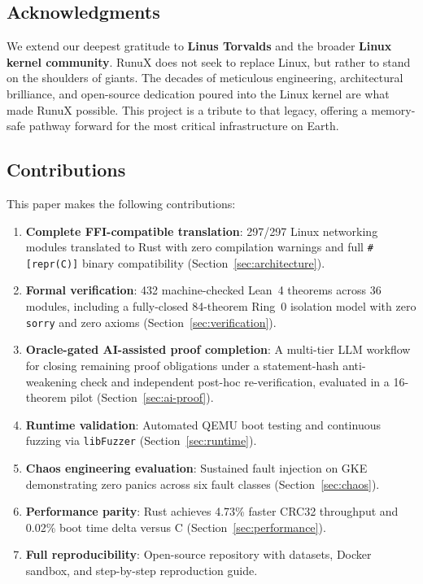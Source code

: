 \documentclass[sigconf,nonacm=false]{acmart}
\begin{document}
\subsection{Acknowledgments}
We extend our deepest gratitude to \textbf{Linus Torvalds} and the broader \textbf{Linux kernel community}. RunuX does not seek to replace Linux, but rather to stand on the shoulders of giants. The decades of meticulous engineering, architectural brilliance, and open-source dedication poured into the Linux kernel are what made RunuX possible. This project is a tribute to that legacy, offering a memory-safe pathway forward for the most critical infrastructure on Earth.

\subsection{Contributions}
This paper makes the following contributions:
\begin{enumerate}
    \item \textbf{Complete FFI-compatible translation}: 297/297 Linux networking modules translated to Rust with zero compilation warnings and full \texttt{\#[repr(C)]} binary compatibility (Section~\ref{sec:architecture}).
    \item \textbf{Formal verification}: 432 machine-checked Lean~4 theorems across 36 modules, including a fully-closed 84-theorem Ring~0 isolation model with zero \texttt{sorry} and zero axioms (Section~\ref{sec:verification}).
    \item \textbf{Oracle-gated AI-assisted proof completion}: A multi-tier LLM workflow for closing remaining proof obligations under a statement-hash anti-weakening check and independent post-hoc re-verification, evaluated in a 16-theorem pilot (Section~\ref{sec:ai-proof}).
    \item \textbf{Runtime validation}: Automated QEMU boot testing and continuous fuzzing via \texttt{libFuzzer} (Section~\ref{sec:runtime}).
    \item \textbf{Chaos engineering evaluation}: Sustained fault injection on GKE demonstrating zero panics across six fault classes (Section~\ref{sec:chaos}).
    \item \textbf{Performance parity}: Rust achieves 4.73\% faster CRC32 throughput and 0.02\% boot time delta versus C (Section~\ref{sec:performance}).
    \item \textbf{Full reproducibility}: Open-source repository with datasets, Docker sandbox, and step-by-step reproduction guide.
\end{enumerate}
\end{document}
